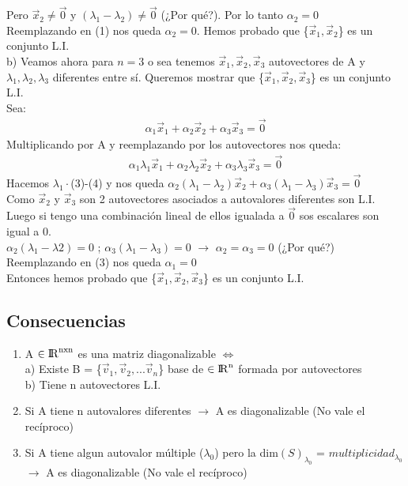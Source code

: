 \documentclass{article}
\begin{document}
Pero $\vec{x}_2 \neq \vec{0}$ y $(\lambda_1 - \lambda_2) \neq \vec{0}$ (¿Por qué?). Por lo tanto $\alpha_2=0$\\
Reemplazando en (1) nos queda $\alpha_2=0$. Hemos probado que \{$\vec{x}_{1}, \vec{x}_2$\} es un conjunto L.I. \\
b) Veamos ahora para $n=3$ o sea tenemos $\vec{x}_{1}, \vec{x}_2, \vec{x}_3$ autovectores de A y $\lambda_1, \lambda_2, \lambda_3$ diferentes entre sí. Queremos mostrar que \{$\vec{x}_{1}, \vec{x}_2, \vec{x}_3$\} es un conjunto L.I.\\
Sea: 
\begin{align}
\alpha_1\vec{x}_1+\alpha_2\vec{x}_2+\alpha_3\vec{x}_3 = \vec{0}
\end{align}
Multiplicando por A y reemplazando por los autovectores nos queda:
\begin{align}
\alpha_{1}\lambda_1\vec{x}_1+\alpha_{2}\lambda_2\vec{x}_2 + \alpha_{3}\lambda_3\vec{x}_3 = \vec{0}
\end{align}
Hacemos $\lambda_1\cdot$(3)-(4) y nos queda $\alpha_2(\lambda_1-\lambda_2)\vec{x}_2+\alpha_3(\lambda_1-\lambda_3)\vec{x}_3=\vec{0}$ \\
Como $\vec{x}_2$ y $\vec{x}_3$ son 2 autovectores asociados a autovalores diferentes son L.I. Luego si tengo una combinación lineal de ellos igualada a $\vec{0}$ sos escalares son igual a 0.\\
$\alpha_2(\lambda_1-\lambda2)=0$ ; $\alpha_3(\lambda_1-\lambda_3)=0$ $\rightarrow$ $\alpha_2 = \alpha_3 = 0$ (¿Por qué?)\\
Reemplazando en (3) nos queda $\alpha_1=0$\\
Entonces hemos probado que \{$\vec{x}_{1}, \vec{x}_2, \vec{x}_3$\} es un conjunto L.I.
\newpage
\subsection{Consecuencias}
\begin{enumerate}
\item A $\in \rm {I\!R}^{nxn}$ es una matriz diagonalizable $\Leftrightarrow$ \\
a) Existe B = \{$\vec{v}_{1}, \vec{v}_2,... \vec{v}_n $\} base de $\in \rm {I\!R}^{n}$ formada por autovectores \\
b) Tiene n autovectores L.I.
\item Si A tiene n autovalores diferentes $\rightarrow$ A es diagonalizable (No vale el recíproco)
\item Si A tiene algun autovalor múltiple ($\lambda_0$) pero la dim$(S)_{\lambda_0}$ = $multiplicidad_{\lambda_0}$ $\rightarrow $ A es diagonalizable (No vale el recíproco)
\end{enumerate}
\end{document}
